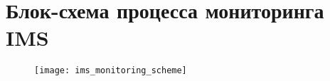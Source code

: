 \chapter{Блок-схема процесса мониторинга IMS}
\label{app:IMS:MonitoringScheme}
\begin{figure}[H]
\texttt{[image: ims\_monitoring\_scheme]}
\end{figure}